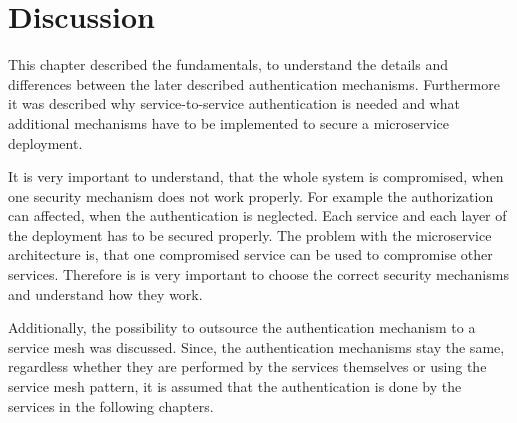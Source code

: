 \section{Discussion}
This chapter described the fundamentals, to understand the details and differences between the later described authentication mechanisms.
Furthermore it was described why service-to-service authentication is needed and what additional mechanisms have to be implemented to secure a microservice deployment.

It is very important to understand, that the whole system is compromised, when one security mechanism does not work properly.
For example the authorization can affected, when the authentication is neglected.
Each service and each layer of the deployment has to be secured properly.
The problem with the microservice architecture is, that one compromised service can be used to compromise other services.
Therefore is is very important to choose the correct security mechanisms and understand how they work.

Additionally, the possibility to outsource the authentication mechanism to a service mesh was discussed.
Since, the authentication mechanisms stay the same, regardless whether they are performed by the services themselves or using the service mesh pattern, it is assumed that the authentication is done by the services in the following chapters.



